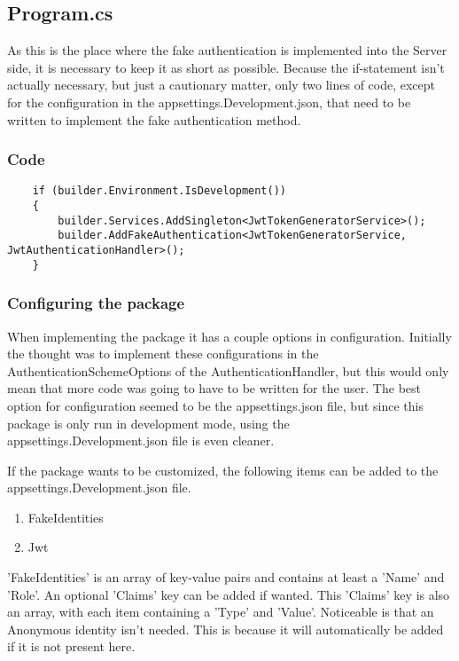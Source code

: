 \subsection{Program.cs}

As this is the place where the fake authentication is implemented into the Server side, it is necessary to keep it as short as possible. Because the if-statement isn't actually necessary, but just a cautionary matter, only two lines of code, except for the configuration in the appsettings.Development.json, that need to be written to implement the fake authentication method.

\subsubsection{Code}

\begin{verbatim}
    if (builder.Environment.IsDevelopment())
    {
        builder.Services.AddSingleton<JwtTokenGeneratorService>();
        builder.AddFakeAuthentication<JwtTokenGeneratorService, JwtAuthenticationHandler>();
    }
\end{verbatim}

\subsubsection{Configuring the package}

When implementing the package it has a couple options in configuration. Initially the thought was to implement these configurations in the AuthenticationSchemeOptions of the AuthenticationHandler, but this would only mean that more code was going to have to be written for the user. The best option for configuration seemed to be the appsettings.json file, but since this package is only run in development mode, using the appsettings.Development.json file is even cleaner.

If the package wants to be customized, the following items can be added to the appsettings.Development.json file.

\begin{enumerate}
    \item FakeIdentities
    \item Jwt
\end{enumerate}

'FakeIdentities' is an array of key-value pairs and contains at least a 'Name' and 'Role'. An optional 'Claims' key can be added if wanted. This 'Claims' key is also an array, with each item containing a 'Type' and 'Value'. Noticeable is that an Anonymous identity isn't needed. This is because it will automatically be added if it is not present here.

